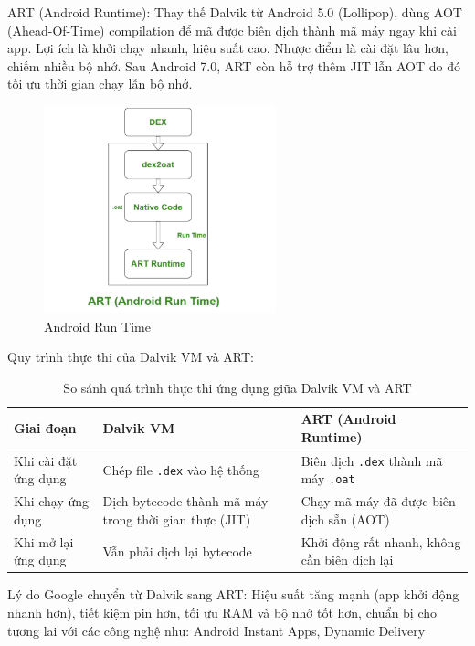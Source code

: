 \begin{flushleft}
    \hspace*{0.8cm}ART (Android Runtime): Thay thế Dalvik từ Android 5.0 (Lollipop), dùng AOT (Ahead-Of-Time) compilation để mã được biên dịch thành mã máy ngay khi cài app.
    Lợi ích là khởi chạy nhanh, hiệu suất cao.
    Nhược điểm là cài đặt lâu hơn, chiếm nhiều bộ nhớ.
    Sau Android 7.0, ART còn hỗ trợ thêm JIT lẫn AOT do đó tối ưu thời gian chạy lẫn bộ nhớ\cite{art-dalvik}.   
    \begin{figure}[H] 
        \centering
        \includegraphics[width=0.6\textwidth]{images/ART.png}
        \caption{Android Run Time}
        \label{fig:android}
    \end{figure}  
\end{flushleft}
\newpage
\begin{flushleft}
    \hspace*{0.8cm}Quy trình thực thi của Dalvik VM và ART:
    \begin{table}[H]
        \centering
        \renewcommand{\arraystretch}{1.5}
        \begin{tabular}{|p{4cm}|p{5cm}|p{5cm}|}
        \hline
        \textbf{Giai đoạn} & \textbf{Dalvik VM} & \textbf{ART (Android Runtime)} \\
        \hline
        Khi cài đặt ứng dụng & Chép file \texttt{.dex} vào hệ thống & Biên dịch \texttt{.dex} thành mã máy \texttt{.oat} \\
        \hline
        Khi chạy ứng dụng & Dịch bytecode thành mã máy trong thời gian thực (JIT) & Chạy mã máy đã được biên dịch sẵn (AOT) \\
        \hline
        Khi mở lại ứng dụng & Vẫn phải dịch lại bytecode & Khởi động rất nhanh, không cần biên dịch lại \\
        \hline
        \end{tabular}
        \caption{So sánh quá trình thực thi ứng dụng giữa Dalvik VM và ART}
        \label{tab:dalvik-vs-art}
        \end{table}
          
    \hspace*{0.8cm} Lý do Google chuyển từ Dalvik sang ART: Hiệu suất tăng mạnh (app khởi động nhanh hơn), tiết kiệm pin hơn, tối ưu RAM và bộ nhớ tốt hơn, chuẩn bị cho tương lai với các công nghệ như: Android Instant Apps, Dynamic Delivery
\end{flushleft}

